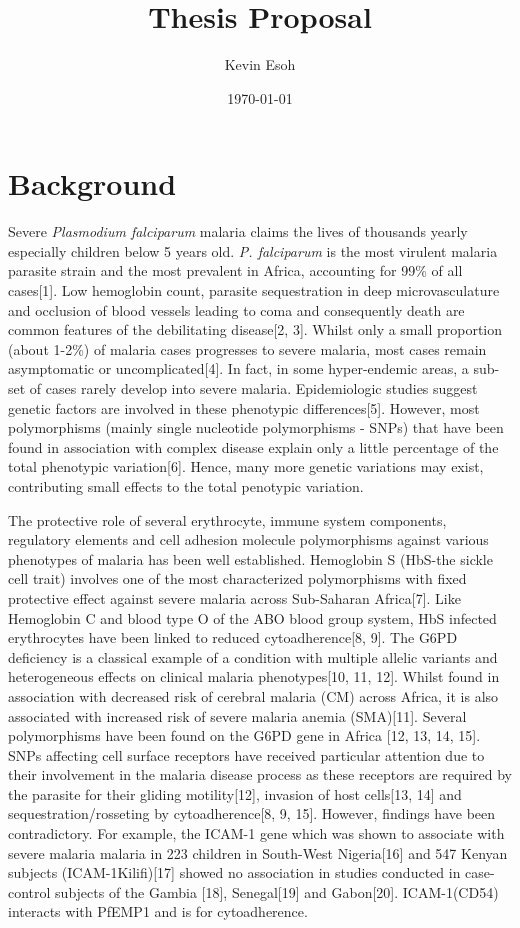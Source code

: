 \documentclass[a4paper,12pts]{report}
\title{Thesis Proposal}
\author{Kevin Esoh}
\date{\today}
\begin{document}
\section{Background}
Severe \textit{Plasmodium falciparum} malaria claims the lives of thousands yearly especially children below 5 years old.  \textit{P. falciparum} is the most virulent malaria parasite strain and the most prevalent in  Africa, accounting for 99\% of all cases[1]. Low hemoglobin count, parasite sequestration in deep microvasculature and occlusion of blood vessels leading to coma and consequently death are common features of the debilitating disease[2, 3]. Whilst only a small proportion (about 1-2\%) of malaria cases progresses to severe malaria, most cases remain asymptomatic or uncomplicated[4]. In fact,  in some hyper-endemic areas, a sub-set of cases rarely develop into severe malaria. Epidemiologic studies suggest genetic factors are involved in these phenotypic differences[5]. However, most polymorphisms  (mainly single nucleotide polymorphisms - SNPs) that have been found in association with complex disease explain only a little percentage of the total phenotypic variation[6]. Hence, many more genetic variations may exist, contributing small effects to the total penotypic variation.

The protective role of several erythrocyte, immune system components, regulatory elements and cell adhesion molecule polymorphisms against various phenotypes of malaria has been well established. Hemoglobin S (HbS-the sickle cell trait) involves one of the most characterized polymorphisms with fixed protective effect against severe malaria across Sub-Saharan Africa[7]. Like Hemoglobin C and blood type O of the ABO blood group system, HbS infected erythrocytes have been linked to reduced cytoadherence[8, 9]. The G6PD deficiency is a classical example of a condition with multiple allelic variants and heterogeneous effects on clinical malaria phenotypes[10, 11, 12]. Whilst found in association with decreased risk of cerebral malaria (CM) across Africa, it is also associated with increased risk of severe malaria anemia (SMA)[11]. Several polymorphisms have been found on the G6PD gene in Africa [12, 13, 14, 15]. SNPs affecting cell surface receptors have received particular attention due to their involvement in the malaria disease process as these receptors are required by the parasite for their gliding motility[12], invasion of host cells[13, 14] and sequestration/rosseting by cytoadherence[8, 9, 15]. However, findings have been contradictory. For example, the ICAM-1 gene which was shown to associate with severe malaria malaria in 223 children in South-West Nigeria[16] and 547 Kenyan subjects (ICAM-1Kilifi)[17] showed no association in studies conducted in case-control subjects of the Gambia [18], Senegal[19] and Gabon[20]. ICAM-1(CD54) interacts with PfEMP1 and is for cytoadherence. 
\end{document}
